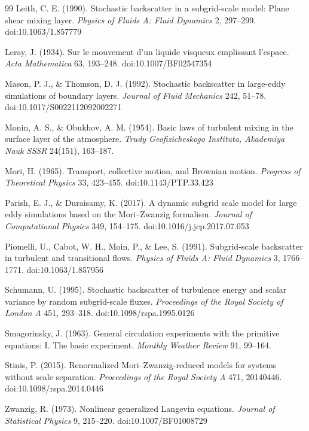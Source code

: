\documentclass[aps,prfluids,preprint,superscriptaddress,nofootinbib]{revtex4-2}
\begin{document}
\begin{thebibliography}{99}
Leith, C. E. (1990). Stochastic backscatter in a subgrid-scale model: Plane shear mixing layer. \emph{Physics of Fluids A: Fluid Dynamics} 2, 297–299. doi:10.1063/1.857779

Leray, J. (1934). Sur le mouvement d'un liquide visqueux emplissant l'espace. \emph{Acta Mathematica} 63, 193–248. doi:10.1007/BF02547354

Mason, P. J., \& Thomson, D. J. (1992). Stochastic backscatter in large-eddy simulations of boundary layers. \emph{Journal of Fluid Mechanics} 242, 51–78. doi:10.1017/S0022112092002271

Monin, A. S., \& Obukhov, A. M. (1954). Basic laws of turbulent mixing in the surface layer of the atmosphere. \emph{Trudy Geofizicheskogo Instituta, Akademiya Nauk SSSR} 24(151), 163–187.

Mori, H. (1965). Transport, collective motion, and Brownian motion. \emph{Progress of Theoretical Physics} 33, 423–455. doi:10.1143/PTP.33.423

Parish, E. J., \& Duraisamy, K. (2017). A dynamic subgrid scale model for large eddy simulations based on the Mori–Zwanzig formalism. \emph{Journal of Computational Physics} 349, 154–175. doi:10.1016/j.jcp.2017.07.053

Piomelli, U., Cabot, W. H., Moin, P., \& Lee, S. (1991). Subgrid-scale backscatter in turbulent and transitional flows. \emph{Physics of Fluids A: Fluid Dynamics} 3, 1766–1771. doi:10.1063/1.857956

Schumann, U. (1995). Stochastic backscatter of turbulence energy and scalar variance by random subgrid-scale fluxes. \emph{Proceedings of the Royal Society of London A} 451, 293–318. doi:10.1098/rspa.1995.0126

Smagorinsky, J. (1963). General circulation experiments with the primitive equations: I. The basic experiment. \emph{Monthly Weather Review} 91, 99–164.

Stinis, P. (2015). Renormalized Mori–Zwanzig-reduced models for systems without scale separation. \emph{Proceedings of the Royal Society A} 471, 20140446. doi:10.1098/rspa.2014.0446

Zwanzig, R. (1973). Nonlinear generalized Langevin equations. \emph{Journal of Statistical Physics} 9, 215–220. doi:10.1007/BF01008729

\end{thebibliography}
\end{document}
